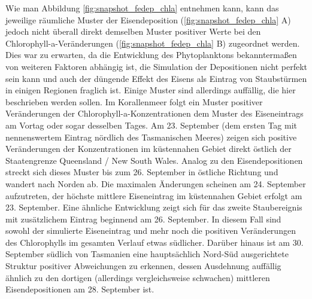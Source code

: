 \documentclass[12pt,a4paper,onecolumn]{scrartcl}
\begin{document}
Wie man Abbildung \ref{fig:snapshot_fedep_chla} entnehmen kann, kann das jeweilige räumliche Muster der Eisendeposition (\ref{fig:snapshot_fedep_chla} A) jedoch nicht überall direkt demselben Muster positiver Werte bei den Chlorophyll-a-Veränderungen (\ref{fig:snapshot_fedep_chla} B) zugeordnet werden. Dies war zu erwarten, da die Entwicklung des Phytoplanktons bekanntermaßen von weiteren Faktoren abhängig ist, die Simulation der Depositionen nicht perfekt sein kann und auch der düngende Effekt des Eisens als Eintrag von Staubstürmen in einigen Regionen fraglich ist. Einige Muster sind allerdings auffällig, die hier beschrieben werden sollen. Im Korallenmeer folgt ein Muster positiver Veränderungen der Chlorophyll-a-Konzentrationen dem Muster des Eiseneintrags am Vortag oder sogar desselben Tages. Am 23. September (dem ersten Tag mit nennenswertem Eintrag nördlich des Tasmanischen Meeres) zeigen sich positive Veränderungen der Konzentrationen im küstennahen Gebiet direkt östlich der Staatengrenze Queensland / New South Wales. Analog zu den Eisendepositionen streckt sich dieses Muster bis zum 26. September in östliche Richtung und wandert nach Norden ab. Die maximalen Änderungen scheinen am 24. September aufzutreten, der höchste mittlere Eiseneintrag im küstennahen Gebiet erfolgt am 23. September. Eine ähnliche Entwicklung zeigt sich für das  zweite Staubereignis mit zusätzlichem Eintrag beginnend am 26. September. In diesem Fall sind sowohl der simulierte Eiseneintrag und mehr noch die positiven Veränderungen des Chlorophylls im gesamten Verlauf etwas südlicher. Darüber hinaus ist am 30. September südlich von Tasmanien eine hauptsächlich Nord-Süd ausgerichtete Struktur positiver Abweichungen zu erkennen, dessen Ausdehnung auffällig ähnlich zu den dortigen (allerdings vergleichsweise schwachen) mittleren Eisendepositionen am 28. September ist. \\
\end{document}
